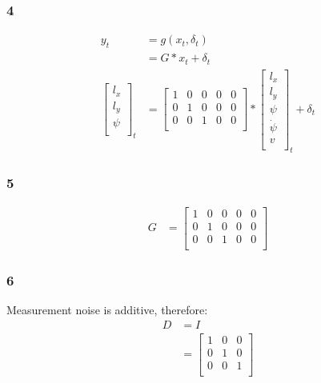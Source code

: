 \documentclass[12pt]{article}
\begin{document}
\subsubsection{4}
\begin{align*}
    y_t                          & = g(x_t, \delta_t)           \\
                                 & = G*x_t + \delta_t           \\
    \begin{bmatrix}
        l_x  \\
        l_y  \\
        \psi \\
    \end{bmatrix}_t & = \begin{bmatrix}
        1 & 0 & 0 & 0 & 0 \\
        0 & 1 & 0 & 0 & 0 \\
        0 & 0 & 1 & 0 & 0 \\
    \end{bmatrix}
    *
    \begin{bmatrix}
        l_x      \\
        l_y      \\
        \psi     \\
        \dot\psi \\
        v        \\
    \end{bmatrix}_t
    +
    \delta_t
\end{align*}
\subsubsection{5}
\begin{align*}
    G & = \begin{bmatrix}
        1 & 0 & 0 & 0 & 0 \\
        0 & 1 & 0 & 0 & 0 \\
        0 & 0 & 1 & 0 & 0 \\
    \end{bmatrix}
\end{align*}
\subsubsection{6}
Measurement noise is additive, therefore:
\begin{align*}
    D & = I                          \\
      & = \begin{bmatrix}
        1 & 0 & 0 \\
        0 & 1 & 0 \\
        0 & 0 & 1 \\
    \end{bmatrix}
\end{align*}
\end{document}
